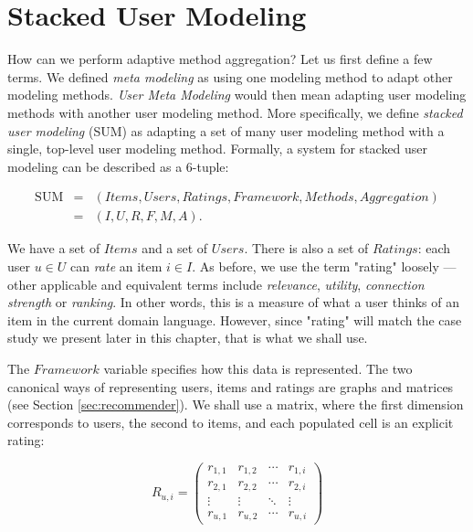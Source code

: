 \section{Stacked User Modeling}
\label{sec:usermetamodeling}

How can we perform adaptive method aggregation?
Let us first define a few terms.
We defined \emph{meta modeling} as using one modeling method to adapt other modeling methods.
\emph{User Meta Modeling} would then mean adapting user modeling methods with another user modeling method.
More specifically, we define \emph{stacked user modeling} (SUM) as adapting a set of many user modeling method
with a single, top-level user modeling method.
Formally, a system for stacked user modeling can be described as a 6-tuple:

\begin{eqnarray*}
  \mathrm{SUM} &=& (Items, Users, Ratings, Framework, Methods, Aggregation)\\
               &=& (I,U,R,F,M,A).
\end{eqnarray*}

We have a set of $Items$ and a set of $Users$.
There is also a set of $Ratings$: each user $u \in U$ can \emph{rate} an item $i \in I$.
As before, we use the term "rating" loosely --- other applicable and equivalent terms include \emph{relevance}, \emph{utility},
\emph{connection strength} or \emph{ranking}. In other words, this is a measure of what a user thinks of an item
in the current domain language. However, since "rating" will match the case study we present later in this chapter,
that is what we shall use. 

The $Framework$ variable specifies how this data is represented.
The two canonical ways of representing users, items and ratings are graphs and matrices (see Section \ref{sec:recommender}).
We shall use a matrix, where the first dimension corresponds to users, the second to items, and each populated cell is an explicit rating:

\begin{equation*}
 R_{u,i} =
 \begin{pmatrix}
  r_{1,1} & r_{1,2} & \cdots & r_{1,i} \\
  r_{2,1} & r_{2,2} & \cdots & r_{2,i} \\
  \vdots  & \vdots  & \ddots & \vdots  \\
  r_{u,1} & r_{u,2} & \cdots & r_{u,i}
 \end{pmatrix}
\end{equation*}

